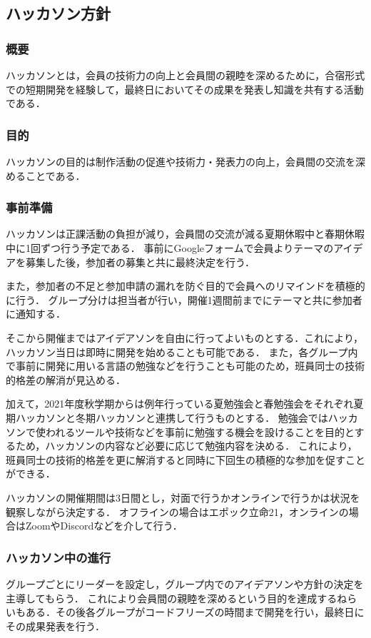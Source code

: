 \subsection*{ハッカソン方針}


\subsubsection*{概要}
ハッカソンとは，会員の技術力の向上と会員間の親睦を深めるために，合宿形式での短期開発を経験して，最終日においてその成果を発表し知識を共有する活動である．

\subsubsection*{目的}
ハッカソンの目的は制作活動の促進や技術力・発表力の向上，会員間の交流を深めることである．

\subsubsection*{事前準備}
ハッカソンは正課活動の負担が減り，会員間の交流が減る夏期休暇中と春期休暇中に1回ずつ行う予定である．
事前にGoogleフォームで会員よりテーマのアイデアを募集した後，参加者の募集と共に最終決定を行う．

また，参加者の不足と参加申請の漏れを防ぐ目的で会員へのリマインドを積極的に行う．
グループ分けは担当者が行い，開催1週間前までにテーマと共に参加者に通知する．

そこから開催まではアイデアソンを自由に行ってよいものとする．これにより，ハッカソン当日は即時に開発を始めることも可能である．
また，各グループ内で事前に開発に用いる言語の勉強などを行うことも可能のため，班員同士の技術的格差の解消が見込める．

加えて，2021年度秋学期からは例年行っている夏勉強会と春勉強会をそれぞれ夏期ハッカソンと冬期ハッカソンと連携して行うものとする．
勉強会ではハッカソンで使われるツールや技術などを事前に勉強する機会を設けることを目的とするため，ハッカソンの内容など必要に応じて勉強内容を決める．
これにより，班員同士の技術的格差を更に解消すると同時に下回生の積極的な参加を促すことができる．


ハッカソンの開催期間は3日間とし，対面で行うかオンラインで行うかは状況を観察しながら決定する．
オフラインの場合はエポック立命21，オンラインの場合はZoomやDiscordなどを介して行う．

\subsubsection*{ハッカソン中の進行}
グループごとにリーダーを設定し，グループ内でのアイデアソンや方針の決定を主導してもらう．
これにより会員間の親睦を深めるという目的を達成するねらいもある．その後各グループがコードフリーズの時間まで開発を行い，最終日にその成果発表を行う．

